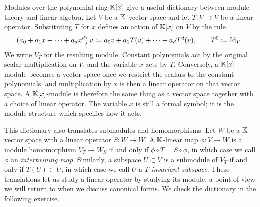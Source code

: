 \documentclass[Notebook.tex]{subfiles}
\begin{document}
\newpage

Modules over the polynomial ring $\mathbb K[x]$ give a useful dictionary between module theory and linear algebra. Let $V$ be a $\mathbb K$-vector space and let $T:V\to V$ be a linear operator. Substituting $T$ for $x$ defines an action of $\mathbb K[x]$ on $V$ by the rule
\[
\left(a_0+a_1x+\cdots+a_dx^d\right)v
\coloneqq a_0v+a_1T(v)+\cdots+a_dT^d(v),\qquad T^0\coloneqq\operatorname{Id}_V.
\]
We write $V_T$ for the resulting module. Constant polynomials act by the original scalar multiplication on $V$, and the variable $x$ acts by $T$. Conversely, a $\mathbb K[x]$-module becomes a vector space once we restrict the scalars to the constant polynomials, and multiplication by $x$ is then a linear operator on that vector space. A $\mathbb K[x]$-module is therefore the same thing as a vector space together with a choice of linear operator. The variable $x$ is still a formal symbol; it is the module structure which specifies how it acts.

This dictionary also translates submodules and homomorphisms. Let $W$ be a $\mathbb K$-vector space with a linear operator $S:W\to W$. A $\mathbb K$-linear map $\phi:V\to W$ is a module homomorphism $V_T\to W_S$ if and only if $\phi\circ T=S\circ\phi$, in which case we call $\phi$ an \emph{intertwining map}. Similarly, a subspace $U\subset V$ is a submodule of $V_T$ if and only if $T(U)\subset U$, in which case we call $U$ a \emph{$T$-invariant subspace}. These translations let us study a linear operator by studying its module, a point of view we will return to when we discuss canonical forms. We check the dictionary in the following exercise.

\hrulefill
\end{document}
